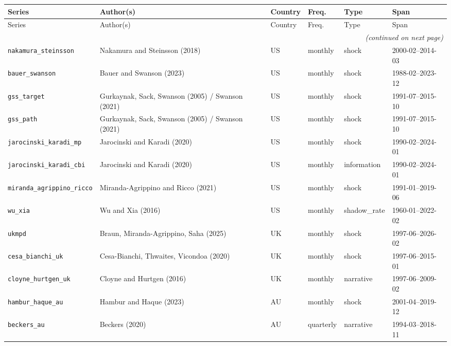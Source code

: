 \begin{longtable}{@{}l p{4.8cm} l l l l@{}}
\toprule
Series & Author(s) & Country & Freq. & Type & Span \\
\midrule
\endfirsthead
\toprule
Series & Author(s) & Country & Freq. & Type & Span \\
\midrule
\endhead
\midrule
\multicolumn{6}{r}{\textit{(continued on next page)}} \\
\endfoot
\bottomrule
\endlastfoot
{\footnotesize\texttt{nakamura\_steinsson}} & {\footnotesize Nakamura and Steinsson (2018)} & US & monthly & shock & 2000-02--2014-03 \\
{\footnotesize\texttt{bauer\_swanson}} & {\footnotesize Bauer and Swanson (2023)} & US & monthly & shock & 1988-02--2023-12 \\
{\footnotesize\texttt{gss\_target}} & {\footnotesize Gurkaynak, Sack, Swanson (2005) / Swanson (2021)} & US & monthly & shock & 1991-07--2015-10 \\
{\footnotesize\texttt{gss\_path}} & {\footnotesize Gurkaynak, Sack, Swanson (2005) / Swanson (2021)} & US & monthly & shock & 1991-07--2015-10 \\
{\footnotesize\texttt{jarocinski\_karadi\_mp}} & {\footnotesize Jarocinski and Karadi (2020)} & US & monthly & shock & 1990-02--2024-01 \\
{\footnotesize\texttt{jarocinski\_karadi\_cbi}} & {\footnotesize Jarocinski and Karadi (2020)} & US & monthly & information & 1990-02--2024-01 \\
{\footnotesize\texttt{miranda\_agrippino\_ricco}} & {\footnotesize Miranda-Agrippino and Ricco (2021)} & US & monthly & shock & 1991-01--2019-06 \\
{\footnotesize\texttt{wu\_xia}} & {\footnotesize Wu and Xia (2016)} & US & monthly & shadow\_rate & 1960-01--2022-02 \\
{\footnotesize\texttt{ukmpd}} & {\footnotesize Braun, Miranda-Agrippino, Saha (2025)} & UK & monthly & shock & 1997-06--2026-02 \\
{\footnotesize\texttt{cesa\_bianchi\_uk}} & {\footnotesize Cesa-Bianchi, Thwaites, Vicondoa (2020)} & UK & monthly & shock & 1997-06--2015-01 \\
{\footnotesize\texttt{cloyne\_hurtgen\_uk}} & {\footnotesize Cloyne and Hurtgen (2016)} & UK & monthly & narrative & 1997-06--2009-02 \\
{\footnotesize\texttt{hambur\_haque\_au}} & {\footnotesize Hambur and Haque (2023)} & AU & monthly & shock & 2001-04--2019-12 \\
{\footnotesize\texttt{beckers\_au}} & {\footnotesize Beckers (2020)} & AU & quarterly & narrative & 1994-03--2018-11 \\
\end{longtable}
